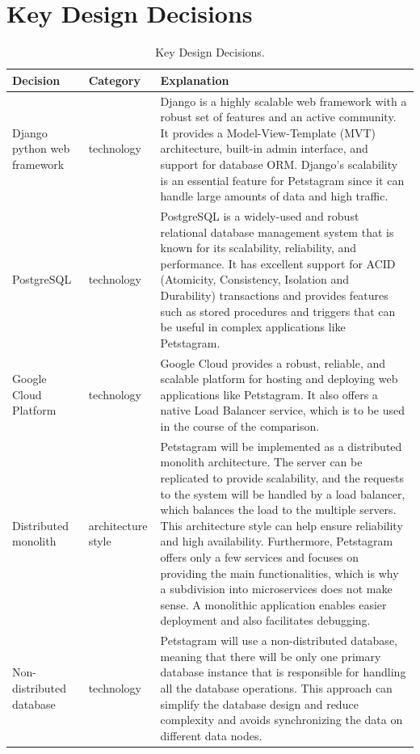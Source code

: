 \documentclass[lettersize,journal]{IEEEtran}
\begin{document}
\section{Key Design Decisions}\label{appendix:key_design_decisions}
\begin{table}[htpb]
    \caption{Key Design Decisions.}
    \label{table:tbl_Key_Design_Decisions} 
    \begin{tabular}{ |m{3cm}|m{2cm}|m{11cm}| } 
        \hline
        Decision&Category&Explanation\\
        \hline
        Django python web framework&technology&Django is a highly scalable web framework with a robust set of features and an active community. It provides a Model-View-Template (MVT) architecture, built-in admin interface, and support for database ORM. Django's scalability is an essential feature for Petstagram since it can handle large amounts of data and high traffic.\\
        \hline
        PostgreSQL &technology&PostgreSQL is a widely-used and robust relational database management system that is known for its scalability, reliability, and performance. It has excellent support for ACID (Atomicity, Consistency, Isolation and Durability) transactions and provides features such as stored procedures and triggers that can be useful in complex applications like Petstagram.\\
        \hline
        Google Cloud Platform&technology&Google Cloud provides a robust, reliable, and scalable platform for hosting and deploying web applications like Petstagram. It also offers a native Load Balancer service, which is to be used in the course of the comparison.\\
        \hline
        Distributed monolith&architecture style&Petstagram will be implemented as a distributed monolith architecture. The server can be replicated to provide scalability, and the requests to the system will be handled by a load balancer, which balances the load to the multiple servers. This architecture style can help ensure reliability and high availability. Furthermore, Petstagram offers only a few services and focuses on providing the main functionalities, which is why a subdivision into microservices does not make sense. A monolithic application enables easier deployment and also facilitates debugging.\\
        \hline
        Non-distributed database&technology&Petstagram will use a non-distributed database, meaning that there will be only one primary database instance that is responsible for handling all the database operations. This approach can simplify the database design and reduce complexity and avoids synchronizing the data on different data nodes.\\

\end{tabular}
\end{table}
\end{document}
